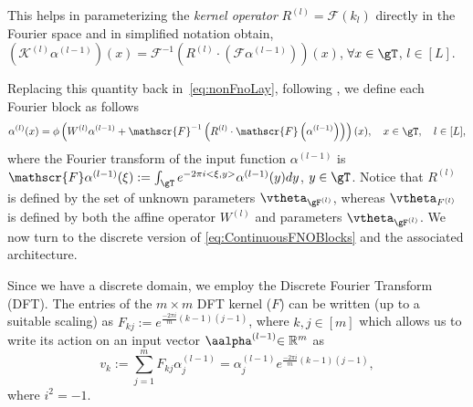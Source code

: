 This helps in parameterizing the \emph{kernel operator} $R^{(l)} = \mathscr{F}(k_l)$ directly in the Fourier space {and in simplified notation obtain}, 
$\left(\mathcal{K}^{(l)} \alpha^{({l-1})}\right)(x)
=\mathscr{F}^{-1}\left(R^{(l)} \cdot\left(\mathscr{F} \alpha^{({l-1})}\right)\right)(x)$, $\forall x \in \gT$, $l\in [L]$.

{Replacing this quantity back in~\eqref{eq:nonFnoLay},} 
following \citep{li_fourier_2021}, we define each Fourier block as follows
\begin{align}
    \alpha^{(l)}(x)
    =
    \phi\left(W^{(l)} \alpha^{(l-1)} 
    + 
    \mathscr{F}^{-1}\left(R^{(l)} \cdot \mathscr{F}\left(\alpha^{(l-1)}\right)\right)\right)(x), \quad x\in\gT, \quad l \in [L],
    \label{eq:ContinuousFNOBlocks}
\end{align}
where 
the Fourier transform of the input function $\alpha^{({l-1})}$ is $\mathscr{F}\alpha^{({l-1})}(\xi) := \int_{\gT} e^{-2\pi i <\xi ,y>} \alpha^{({l-1})}(y) dy$, $y\in \gT$.
%
{Notice that $R^{(l)}$ is defined by the set of unknown parameters $\vtheta_{\gF^{(l)}}$, whereas $\vtheta_{F^{(l)}}$ is defined by both the affine operator $W^{(l)}$ and parameters $\vtheta_{\gF^{(l)}}$.}
%
We now turn to the discrete version of \eqref{eq:ContinuousFNOBlocks} and the associated architecture.


{Since we have a discrete domain,} we employ the Discrete Fourier Transform (DFT). The entries of the ${m}\times {m}$ DFT kernel ($F$) can be written (up to a suitable scaling) as $F_{kj}:= e^{\frac{-2\pi i}{{m}}(k-1)(j-1)}$, where $k, j \in [{m}]$ which allows us to write its action on an input vector $\aalpha^{(l-1)}{\in\mathbb{R}^m}$ as
    \begin{equation}
        v_k := \sum_{j=1}^{{m}} F_{kj}\alpha^{(l-1)}_j = \alpha^{(l-1)}_j e^{\frac{-2\pi i}{{m}}(k-1)(j-1)},
    \end{equation}
where $i^2 = -1$.


